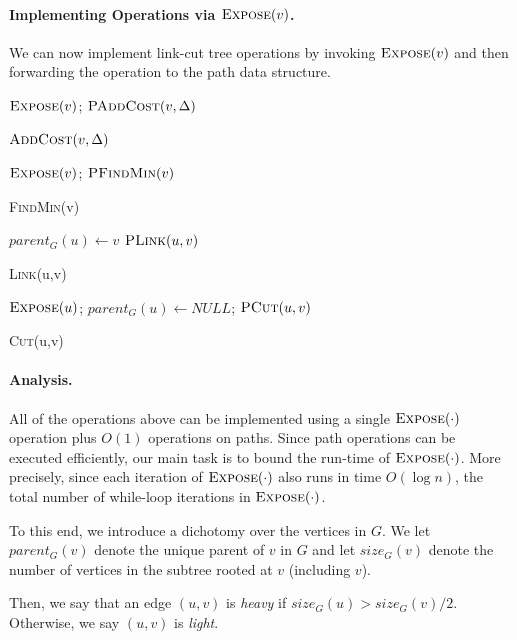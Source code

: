 \paragraph{Implementing Operations via $\textsc{Expose}(v)$.} We can now implement link-cut tree operations by invoking $\textsc{Expose}(v)$ and then forwarding the operation to the path data structure. 
\begin{algorithm}[H]
  \SetAlgoLined
  $\textsc{Expose}(v)$; $\textsc{PAddCost}(v, \Delta)$
  \caption{$\textsc{AddCost}(v, \Delta)$}
\end{algorithm}
\begin{algorithm}[H]
  \SetAlgoLined
  $\textsc{Expose}(v)$; \Return $\textsc{PFindMin}(v)$
  \caption{\textsc{FindMin}(v)}
\end{algorithm}
\begin{algorithm}[H]
  \SetAlgoLined
  $parent_G(u) \gets v$\;
  $\textsc{PLink}(u,v)$
  \caption{\textsc{Link}(u,v)}
\end{algorithm}
\begin{algorithm}[H]
  \SetAlgoLined
  $\textsc{Expose}(u)$; $parent_G(u) \gets NULL$; $\textsc{PCut}(u,v)$\;
  \caption{\textsc{Cut}(u,v)}
\end{algorithm}

\paragraph{Analysis.} All of the operations above can be implemented using a single $\textsc{Expose}(\cdot)$ operation plus $O(1)$ operations on paths. Since path operations can be executed efficiently, our main task is to bound the run-time of $\textsc{Expose}(\cdot)$. More precisely, since each iteration of $\textsc{Expose}(\cdot)$ also runs in time $O(\log n)$, the total number of while-loop iterations in $\textsc{Expose}(\cdot)$.

To this end, we introduce a dichotomy over the vertices in $G$. We let $parent_G(v)$ denote the unique parent of $v$ in $G$ and let $size_G(v)$ denote the number of vertices in the subtree rooted at $v$ (including $v$). 

\begin{definition}
Then, we say that an edge $(u,v)$ is \emph{heavy} if $size_G(u) > size_G(v)/2$. Otherwise, we say $(u,v)$ is \emph{light}. 
\end{definition}

